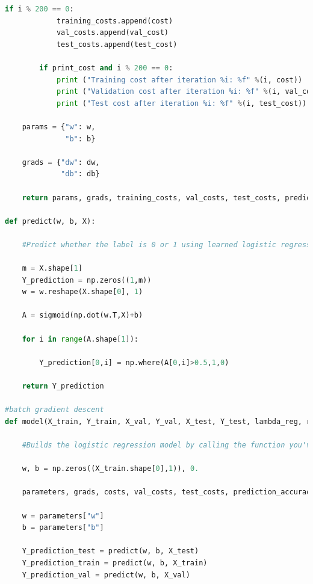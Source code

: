 \documentclass{article} %
\begin{document}
{\begin{lstlisting}[language=Python]
        if i % 200 == 0:
            training_costs.append(cost)
            val_costs.append(val_cost)
            test_costs.append(test_cost)
        
        if print_cost and i % 200 == 0:
            print ("Training cost after iteration %i: %f" %(i, cost))
            print ("Validation cost after iteration %i: %f" %(i, val_cost))
            print ("Test cost after iteration %i: %f" %(i, test_cost))
    
    params = {"w": w,
              "b": b}
    
    grads = {"dw": dw,
             "db": db}
    
    return params, grads, training_costs, val_costs, test_costs, prediction_accuracy_early_train, prediction_accuracy_early_val, prediction_accuracy_early_test

def predict(w, b, X):

    #Predict whether the label is 0 or 1 using learned logistic regression parameters (w, b)
    
    m = X.shape[1]
    Y_prediction = np.zeros((1,m))
    w = w.reshape(X.shape[0], 1)
    
    A = sigmoid(np.dot(w.T,X)+b)
    
    for i in range(A.shape[1]):
        
        Y_prediction[0,i] = np.where(A[0,i]>0.5,1,0)
    
    return Y_prediction

#batch gradient descent
def model(X_train, Y_train, X_val, Y_val, X_test, Y_test, lambda_reg, reg_type, num_iterations = 5000, learning_rate = 0.5, print_cost = True, early_stopping = True):

    #Builds the logistic regression model by calling the function you've implemented previously
    
    w, b = np.zeros((X_train.shape[0],1)), 0.
    
    parameters, grads, costs, val_costs, test_costs, prediction_accuracy_early_train, prediction_accuracy_early_val, prediction_accuracy_early_test = optimize(w, b, X_train, Y_train, X_val, Y_val, X_test, Y_test, lambda_reg, reg_type, num_iterations, learning_rate, print_cost = True, early_stopping = True)
    
    w = parameters["w"]
    b = parameters["b"]
    
    Y_prediction_test = predict(w, b, X_test)
    Y_prediction_train = predict(w, b, X_train)
    Y_prediction_val = predict(w, b, X_val)


\end{lstlisting}}
\end{document}
